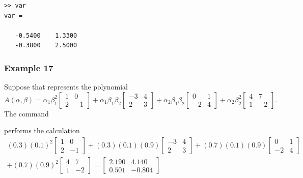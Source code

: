 \documentclass[english,11pt]{article}
\theoremstyle{break} \theorembodyfont{\small\rm}
\begin{document}
\begin{minipage}{7.5cm}
\begin{lstlisting}[rulecolor=\color{red}]
>> var
var =

   -0.5400    1.3300
   -0.3800    2.5000
\end{lstlisting}
\end{minipage}
\vspace{0.2cm}

\subsubsection*{Example 17}

Suppose that  represents the polynomial
\[
 A(\alpha,\beta) = \alpha_1\beta_1^2 \begin{bmatrix} 1 & 0 \\ 2 & -1 \end{bmatrix} +
 \alpha_1\beta_1\beta_2 \begin{bmatrix} -3 & 4 \\ 2 & 3 \end{bmatrix} + 
 \alpha_2\beta_1\beta_2 \begin{bmatrix} 0 & 1 \\ -2 & 4 \end{bmatrix} +
 \alpha_2\beta_2^2 \begin{bmatrix} 4 & 7 \\ 1 & -2 \end{bmatrix}.
\]
The command

\vspace{0.5cm}%
\begin{minipage}{9.5cm}
\end{minipage}
\vspace{0.2cm}

\noindent performs the calculation
\begin{multline*}
 (0.3)(0.1)^2 \begin{bmatrix} 1 & 0 \\ 2 & -1 \end{bmatrix} +
 (0.3)(0.1)(0.9) \begin{bmatrix} -3 & 4 \\ 2 & 3 \end{bmatrix} + 
 (0.7)(0.1)(0.9) \begin{bmatrix} 0 & 1 \\ -2 & 4 \end{bmatrix} \\ +
 (0.7)(0.9)^2 \begin{bmatrix} 4 & 7 \\ 1 & -2 \end{bmatrix}  =
 \begin{bmatrix} 2.190 & 4.140 \\ 0.501 & -0.804 \end{bmatrix}
\end{multline*}
\end{document}
